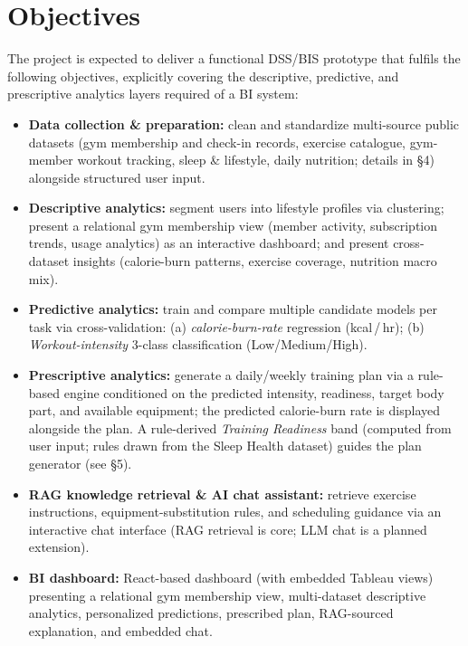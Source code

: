 \documentclass[11pt,a4paper]{article}
\begin{document}
\section{Objectives}
The project is expected to deliver a functional DSS/BIS prototype that fulfils the following objectives, explicitly covering the descriptive, predictive, and prescriptive analytics layers required of a BI system:
\begin{itemize}
  \item \textbf{Data collection \& preparation:} clean and standardize multi-source public datasets (gym membership and check-in records, exercise catalogue, gym-member workout tracking, sleep \& lifestyle, daily nutrition; details in \S4) alongside structured user input.
  \item \textbf{Descriptive analytics:} segment users into lifestyle profiles via clustering; present a relational gym membership view (member activity, subscription trends, usage analytics) as an interactive dashboard; and present cross-dataset insights (calorie-burn patterns, exercise coverage, nutrition macro mix).
  \item \textbf{Predictive analytics:} train and compare multiple candidate models per task via cross-validation: (a) \emph{calorie-burn-rate} regression (kcal\,/\,hr); (b) \emph{Workout-intensity} 3-class classification (Low/Medium/High).
  \item \textbf{Prescriptive analytics:} generate a daily/weekly training plan via a rule-based engine conditioned on the predicted intensity, readiness, target body part, and available equipment; the predicted calorie-burn rate is displayed alongside the plan. A rule-derived \emph{Training Readiness} band (computed from user input; rules drawn from the Sleep Health dataset) guides the plan generator (see \S5).
  \item \textbf{RAG knowledge retrieval \& AI chat assistant:} retrieve exercise instructions, equipment-substitution rules, and scheduling guidance via an interactive chat interface (RAG retrieval is core; LLM chat is a planned extension).
  \item \textbf{BI dashboard:} React-based dashboard (with embedded Tableau views) presenting a relational gym membership view, multi-dataset descriptive analytics, personalized predictions, prescribed plan, RAG-sourced explanation, and embedded chat.
\end{itemize}

\end{document}
